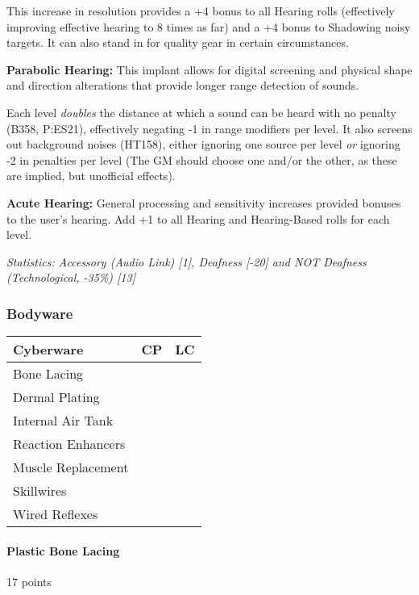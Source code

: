 \begin{multicols*}{3}
	This increase in resolution provides a +4 bonus to all Hearing rolls (effectively improving effective hearing to 8 times as far) and a +4 bonus to Shadowing noisy targets. It can also stand in for quality gear in certain circumstances.
	
	\textbf{Parabolic Hearing:} This implant allows for digital screening and physical shape and direction alterations that provide longer range detection of sounds.	
	
	Each level \textit{doubles} the distance at which a sound can be heard with no penalty (B358, P:ES21), effectively negating -1 in range modifiers per level. It also screens out background noises (HT158), either ignoring one source per level \textit{or} ignoring -2 in penalties per level (The GM should choose one and/or the other, as these are implied, but unofficial effects).
	
	\textbf{Acute Hearing:} General processing and sensitivity increases provided bonuses to the user's hearing. Add +1 to all Hearing and Hearing-Based rolls for each level.
	
	\textit{\textcolor{OliveGreen}{Statistics: Accessory (Audio Link) [1], Deafness [-20] and NOT Deafness (Technological, -35\%) [13]}}
	
	\subsubsection{Bodyware}
	
	\begin{center}
		\begin{tabularx}{0.32\textwidth}{|X|c|c|}
			\hline
			Cyberware & CP & LC\\
			\hline
			\hline
			Bone Lacing & & \\
			Dermal Plating & & \\
			Internal Air Tank & & \\
			Reaction Enhancers & & \\
			Muscle Replacement & & \\
			Skillwires & & \\
			Wired Reflexes & & \\
			\hline
		\end{tabularx}
	\end{center}
		
	\paragraph{Plastic Bone Lacing}
	\begin{flushright}
		17 points
	\end{flushright}
	

\end{multicols*}
